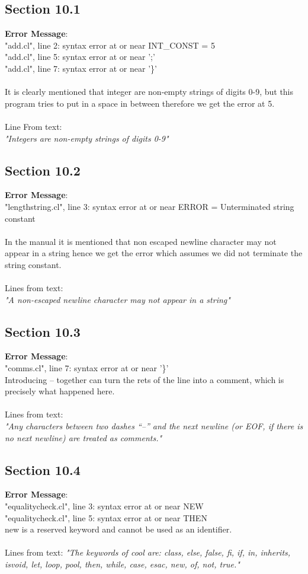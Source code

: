 \documentclass[12pt]{article}
\begin{document}
\subsection{Section 10.1}
\textbf{Error Message}:\\
"add.cl", line 2: syntax error at or near INT\_CONST = 5\\
"add.cl", line 5: syntax error at or near ';'\\
"add.cl", line 7: syntax error at or near '\}'\\
\\
It is clearly mentioned that integer are non-empty strings of digits 0-9, but this program tries to  put in a space in between therefore we get the error at 5.\\\\
Line From text:\\
\textit{"Integers are non-empty strings of digits 0-9"}
\subsection{Section 10.2}
\textbf{Error Message}:\\
"lengthstring.cl", line 3: syntax error at or near ERROR = Unterminated string constant\\\\
In the manual it is mentioned that non escaped newline character may not appear in a string hence we get the error which assumes we did not terminate the string constant.\\\\
Lines from text:\\
\textit{"A non-escaped newline character may not appear in a string"}
\subsection{Section 10.3}
\textbf{Error Message}:\\
"comms.cl", line 7: syntax error at or near '\}'\\
Introducing -- together can turn the rets of the line into a comment, which is precisely what happened here.\\\\
Lines from text:\\
\textit{"Any characters between two dashes “--” and the next newline
(or EOF, if there is no next newline) are treated as comments."}
\subsection{Section 10.4}
\textbf{Error Message}:\\
"equalitycheck.cl", line 3: syntax error at or near NEW\\
"equalitycheck.cl", line 5: syntax error at or near THEN\\
new is a reserved keyword and cannot be used as an identifier.\\\\
Lines from text:
\textit{"The keywords of cool are: class, else, false, fi, if, in, inherits, isvoid, let, loop, pool, then, while,
case, esac, new, of, not, true."}
\end{document}
